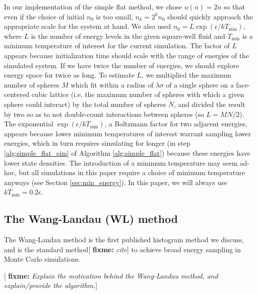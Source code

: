 \documentclass[11pt]{article}
\renewcommand{\t}{\text} %
\newcommand{\p}[1]{\left(#1\right)} %
\newcommand{\red}[1]{{\bf \color{red} #1}}
\newcommand{\fixme}[1]{[\red{fixme:} \emph{#1}]}
\begin{document}
In our implementation of the simple flat method, we chose $u\p{n}=2n$
so that even if the choice of initial $n_0$ is too small, $n_k=2^kn_0$
should quickly approach the appropriate scale for the system at
hand. We also used $n_0=L\exp\p{\epsilon/kT_{\t{min}}}$, where $L$ is
the number of energy levels in the given square-well fluid and
$T_{\t{min}}$ is a minimum temperature of interest for the current
simulation. The factor of $L$ appears because initialization time
should scale with the range of energies of the simulated system. If we
have twice the number of energies, we should explore energy space for
twice as long. To estimate $L$, we multiplied the maximum number of
spheres $M$ which fit within a radius of $\lambda\sigma$ of a single
sphere on a face-centered cubic lattice (i.e. the maximum number of
spheres with which a given sphere could interact) by the total number
of spheres $N$, and divided the result by two so as to not
double-count interactions between spheres (so $L=MN/2$). The
exponential $\exp\p{\epsilon/kT_{\t{min}}}$, a Boltzmann factor for
two adjacent energies, appears because lower minimum temperatures of
interest warrant sampling lower energies, which in turn requires
simulating for longer (in step \ref{alg:simple_flat_sim} of Algorithm
\ref{alg:simple_flat}) because these energies have lower state
densities. The introduction of a minimum temperature may seem ad-hoc,
but all simulations in this paper require a choice of minimum
temperature anyways (see Section \ref{sec:min_energy}). In this paper,
we will always use $kT_{\t{min}}=0.2\epsilon$.

\subsection{The Wang-Landau (WL) method}
\label{sec:wang_landau}

The Wang-Landau method is the first published histogram method we
discuss, and is the standard method\fixme{cite} to achieve broad
energy sampling in Monte Carlo simulations\cite{wang_landau,
  wang_landau_analysis, wang_landau_mod}.


\fixme{Explain the motivation behind the Wang-Landau method, and
  explain/provide the algorithm.}
\end{document}
